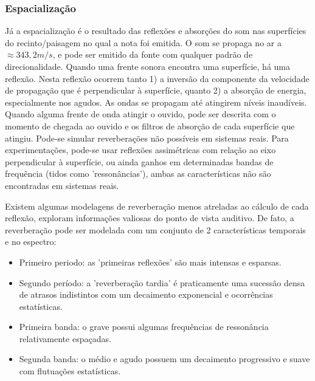 \subsubsection{Espacialização}
Já a espacialização é o resultado das reflexões e absorções do som nas superfícies do recinto/paisagem no qual a nota foi emitida. O som se propaga no ar a $\approx 343,2m/s$, e pode ser emitido da fonte com qualquer padrão de direcionalidade. Quando uma frente sonora encontra uma superfície, há uma reflexão. Nesta reflexão ocorrem tanto 1) a inversão da componente da velocidade de propagação que é perpendicular à superfície, quanto 2) a absorção de energia, especialmente nos agudos. As ondas se propagam até atingirem níveis inaudíveis. Quando alguma frente de onda atingir o ouvido, pode ser descrita com o momento de chegada ao ouvido e os filtros de absorção de cada superfície que atingiu. Pode-se simular reverberações não possíveis em sistemas reais. Para experimentações, pode-se usar reflexões assimétricas com relação ao eixo perpendicular à superfície, ou ainda ganhos em determinadas bandas de frequência (tidos como 'ressonâncias'), ambas as características não são encontradas em sistemas reais.

Existem algumas modelagens de reverberação menos atreladas ao cálculo de cada reflexão, exploram informações valiosas do ponto de vista auditivo. De fato, a reverberação pode ser modelada com um conjunto de 2 características temporais e no espectro:
\begin{itemize}
    \item Primeiro periodo: as 'primeiras reflexões' são mais intensas e esparsas.
    \item Segundo período: a 'reverberação tardia' é praticamente uma sucessão densa de atrasos indistintos com um decaimento exponencial e ocorrências estatísticas.
    \item Primeira banda: o grave possui algumas frequências de ressonância relativamente espaçadas.
    \item Segunda banda: o médio e agudo possuem um decaimento progressivo e suave com flutuações estatísticas.
\end{itemize}

